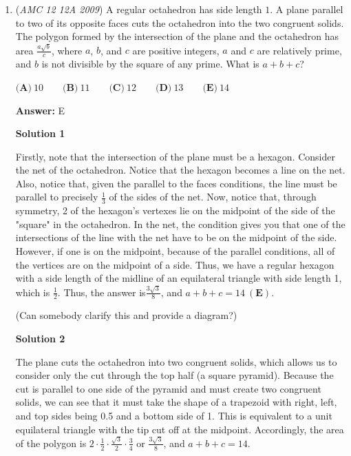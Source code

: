 \begin{enumerate}
	\item (\textit{AMC 12 12A 2009}) A regular octahedron has side length $1$. A plane parallel to two of its opposite faces cuts the octahedron into the two congruent solids. The polygon formed by the intersection of the plane and the octahedron has area $\frac {a\sqrt {b}}{c}$, where $a$, $b$, and $c$ are positive integers, $a$ and $c$ are relatively prime, and $b$ is not divisible by the square of any prime. What is $a + b + c$?


 $\textbf{(A)}\ 10\qquad \textbf{(B)}\ 11\qquad \textbf{(C)}\ 12\qquad \textbf{(D)}\ 13\qquad \textbf{(E)}\ 14$

 \textbf{Answer: }E



\textbf{Solution 1}

Firstly, note that the intersection of the plane must be a hexagon. Consider the net of the octahedron. Notice that the hexagon becomes a line on the net. Also, notice that, given the parallel to the faces conditions, the line must be parallel to precisely $\frac{1}{3}$ of the sides of the net. Now, notice that, through symmetry, 2 of the hexagon's vertexes lie on the midpoint of the side of the "square" in the octahedron. In the net, the condition gives you that one of the intersections of the line with the net have to be on the midpoint of the side. However, if one is on the midpoint, because of the parallel conditions, all of the vertices are on the midpoint of a side. Thus, we have a regular hexagon with a side length of the midline of an equilateral triangle with side length 1, which is $\frac{1}{2}$. Thus, the answer is$\frac {3\sqrt {3}}{8}$, and $a + b + c = 14\ \mathbf{(E)}$.

 (Can somebody clarify this and provide a diagram?)

 



\textbf{Solution 2}

The plane cuts the octahedron into two congruent solids, which allows us to consider only the cut through the top half (a square pyramid). Because the cut is parallel to one side of the pyramid and must create two congruent solids, we can see that it must take the shape of a trapezoid with right, left, and top sides being 0.5 and a bottom side of 1. This is equivalent to a unit equilateral triangle with the tip cut off at the midpoint. Accordingly, the area of the polygon is $2 \cdot \frac{1}{2} \cdot \frac{\sqrt{3}}{2} \cdot \frac{3}{4}$ or $\frac{3\sqrt{3}}{8}$, and $a + b + c = 14$.


\end{enumerate}
